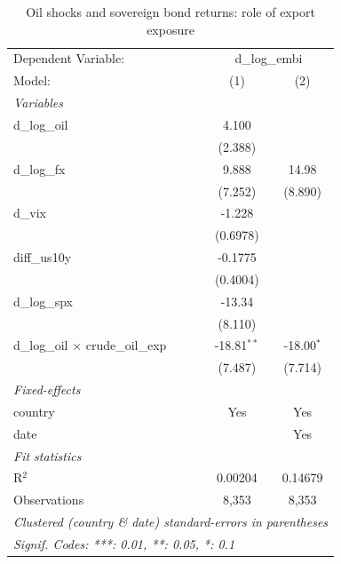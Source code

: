 
\begin{table}[htbp]
   \caption{\label{tab:claim1_oil} Oil shocks and sovereign bond returns: role of export exposure}
   \centering
   \begin{tabular}{lcc}
      \tabularnewline \midrule \midrule
      Dependent Variable: & \multicolumn{2}{c}{d\_log\_embi}\\
      Model:                                    & (1)           & (2)\\  
      \midrule
      \emph{Variables}\\
      d\_log\_oil                               & 4.100         &   \\   
                                                & (2.388)       &   \\   
      d\_log\_fx                                & 9.888         & 14.98\\   
                                                & (7.252)       & (8.890)\\   
      d\_vix                                    & -1.228        &   \\   
                                                & (0.6978)      &   \\   
      diff\_us10y                               & -0.1775       &   \\   
                                                & (0.4004)      &   \\   
      d\_log\_spx                               & -13.34        &   \\   
                                                & (8.110)       &   \\   
      d\_log\_oil $\times$ crude\_oil\_exp      & -18.81$^{**}$ & -18.00$^{*}$\\   
                                                & (7.487)       & (7.714)\\   
      \midrule
      \emph{Fixed-effects}\\
      country                                   & Yes           & Yes\\  
      date                                      &               & Yes\\  
      \midrule
      \emph{Fit statistics}\\
      R$^2$                                     & 0.00204       & 0.14679\\  
      Observations                              & 8,353         & 8,353\\  
      \midrule \midrule
      \multicolumn{3}{l}{\emph{Clustered (country \& date) standard-errors in parentheses}}\\
      \multicolumn{3}{l}{\emph{Signif. Codes: ***: 0.01, **: 0.05, *: 0.1}}\\
   \end{tabular}
\end{table}


